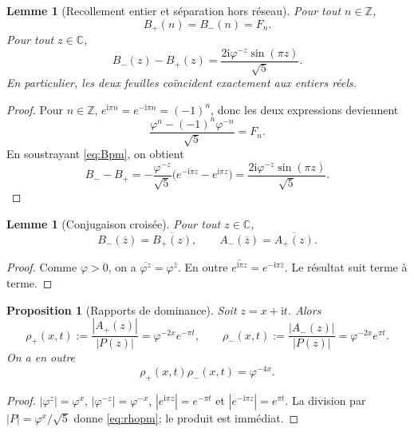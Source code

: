 \documentclass[11pt,a4paper]{article}
\newtheorem{proposition}[theorem]{Proposition}
\newtheorem{lemma}[theorem]{Lemme}
\newcommand{\C}{\mathbb C}
\newcommand{\Z}{\mathbb Z}
\newcommand{\ii}{\mathrm i}
\newcommand{\ph}{\varphi}
\begin{document}
\begin{lemma}[Recollement entier et séparation hors réseau]\label{lem:gluing}
Pour tout $n\in\Z$,
\[
 B_+(n)=B_-(n)=F_n.
\]
Pour tout $z\in\C$,
\begin{equation}\label{eq:sheetdifference}
 B_-(z)-B_+(z)=\frac{2\ii\ph^{-z}\sin(\pi z)}{\sqrt5}.
\end{equation}
En particulier, les deux feuilles coïncident exactement aux entiers réels.
\end{lemma}

\begin{proof}
Pour $n\in\Z$, $e^{\ii\pi n}=e^{-\ii\pi n}=(-1)^n$, donc les deux expressions deviennent
\[
 \frac{\ph^n-(-1)^n\ph^{-n}}{\sqrt5}=F_n.
\]
En soustrayant \eqref{eq:Bpm}, on obtient
\[
 B_--B_+=-\frac{\ph^{-z}}{\sqrt5}
 \bigl(e^{-\ii\pi z}-e^{\ii\pi z}\bigr)
 =\frac{2\ii\ph^{-z}\sin(\pi z)}{\sqrt5}.
\]
\end{proof}

\begin{lemma}[Conjugaison croisée]\label{lem:conj}
Pour tout $z\in\C$,
\[
 B_-(\overline z)=\overline{B_+(z)},\qquad
 A_-(\overline z)=\overline{A_+(z)}.
\]
\end{lemma}

\begin{proof}
Comme $\ph>0$, on a $\overline{\ph^z}=\ph^{\bar z}$. En outre
$\overline{e^{\ii\pi z}}=e^{-\ii\pi\bar z}$. Le résultat suit terme à terme.
\end{proof}

\begin{proposition}[Rapports de dominance]\label{prop:rho}
Soit $z=x+\ii t$. Alors
\begin{equation}\label{eq:rhopm}
 \rho_+(x,t):=\frac{|A_+(z)|}{|P(z)|}=\ph^{-2x}e^{-\pi t},
 \qquad
 \rho_-(x,t):=\frac{|A_-(z)|}{|P(z)|}=\ph^{-2x}e^{\pi t}.
\end{equation}
On a en outre
\[
 \rho_+(x,t)\rho_-(x,t)=\ph^{-4x}.
\]
\end{proposition}

\begin{proof}
$|\ph^z|=\ph^x$, $|\ph^{-z}|=\ph^{-x}$,
$|e^{\ii\pi z}|=e^{-\pi t}$ et $|e^{-\ii\pi z}|=e^{\pi t}$. La division par $|P|=\ph^x/\sqrt5$ donne \eqref{eq:rhopm}; le produit est immédiat.
\end{proof}
\end{document}
